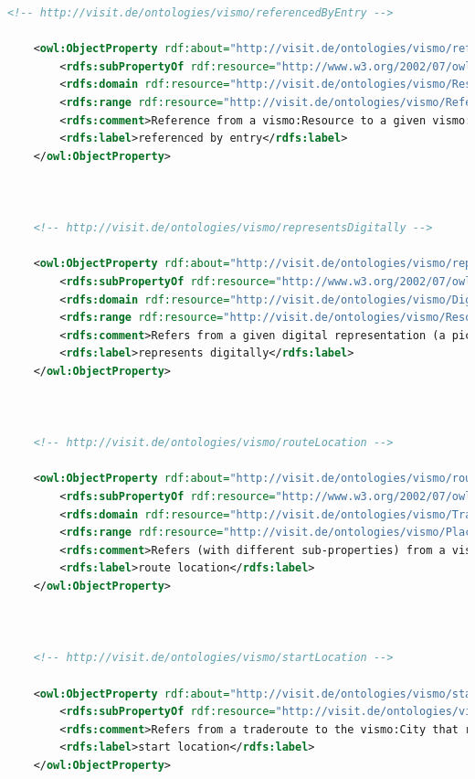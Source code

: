 \begin{lstlisting}[caption={VisMo Ontologie in der letzten (englischen) Version.},label={lst:vismo},captionpos=b,language=xml]
    <!-- http://visit.de/ontologies/vismo/referencedByEntry -->

    <owl:ObjectProperty rdf:about="http://visit.de/ontologies/vismo/referencedByEntry">
        <rdfs:subPropertyOf rdf:resource="http://www.w3.org/2002/07/owl#topObjectProperty"/>
        <rdfs:domain rdf:resource="http://visit.de/ontologies/vismo/Resource"/>
        <rdfs:range rdf:resource="http://visit.de/ontologies/vismo/ReferenceEntry"/>
        <rdfs:comment>Reference from a vismo:Resource to a given vismo:ReferenceEntry, indicating that the associated vismo:Reference contains information about the former.</rdfs:comment>
        <rdfs:label>referenced by entry</rdfs:label>
    </owl:ObjectProperty>
    


    <!-- http://visit.de/ontologies/vismo/representsDigitally -->

    <owl:ObjectProperty rdf:about="http://visit.de/ontologies/vismo/representsDigitally">
        <rdfs:subPropertyOf rdf:resource="http://www.w3.org/2002/07/owl#topObjectProperty"/>
        <rdfs:domain rdf:resource="http://visit.de/ontologies/vismo/DigitalRepresentation"/>
        <rdfs:range rdf:resource="http://visit.de/ontologies/vismo/Resource"/>
        <rdfs:comment>Refers from a given digital representation (a picture, 3D model, etc.) back to the vismo:Resource that it originally represents.</rdfs:comment>
        <rdfs:label>represents digitally</rdfs:label>
    </owl:ObjectProperty>
    


    <!-- http://visit.de/ontologies/vismo/routeLocation -->

    <owl:ObjectProperty rdf:about="http://visit.de/ontologies/vismo/routeLocation">
        <rdfs:subPropertyOf rdf:resource="http://www.w3.org/2002/07/owl#topObjectProperty"/>
        <rdfs:domain rdf:resource="http://visit.de/ontologies/vismo/Traderoute"/>
        <rdfs:range rdf:resource="http://visit.de/ontologies/vismo/Place"/>
        <rdfs:comment>Refers (with different sub-properties) from a vismo:TradeRoute to a vismo:City that is located on said route.</rdfs:comment>
        <rdfs:label>route location</rdfs:label>
    </owl:ObjectProperty>
    


    <!-- http://visit.de/ontologies/vismo/startLocation -->

    <owl:ObjectProperty rdf:about="http://visit.de/ontologies/vismo/startLocation">
        <rdfs:subPropertyOf rdf:resource="http://visit.de/ontologies/vismo/routeLocation"/>
        <rdfs:comment>Refers from a traderoute to the vismo:City that represents the starting point for the route.</rdfs:comment>
        <rdfs:label>start location</rdfs:label>
    </owl:ObjectProperty>
    



\end{lstlisting}
